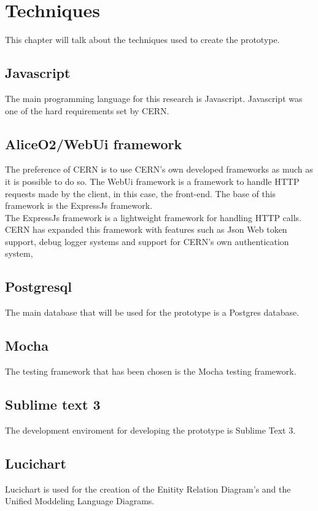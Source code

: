 \documentclass[paper=a4, fontsize=11pt,twoside]{scrartcl}	%
\begin{document}
 

\newpage
\section{Techniques}
This chapter will talk about the techniques used to create the prototype.

\subsection{Javascript}
The main programming language for this research is Javascript. Javascript was one of the hard requirements set by CERN.

\subsection{AliceO2/WebUi framework}
The preference of CERN is to use CERN's own developed frameworks as much as it is possible to do so. The WebUi framework is a framework to handle HTTP requests made by the client, in this case, the front-end. The base of this framework is the ExpressJs framework. \\
The ExpressJs framework is a lightweight framework for handling HTTP calls. CERN has expanded this framework with features such as Json Web token support, debug logger systems and support for CERN's own authentication system,

\subsection{Postgresql}
The main database that will be used for the prototype is a Postgres database. 

\subsection{Mocha}
The testing framework that has been chosen is the Mocha testing framework.

\subsection{Sublime text 3}
The development enviroment for developing the prototype is Sublime Text 3.

\subsection{Lucichart}
Lucichart is used for the creation of the Enitity Relation Diagram's and the Unified Moddeling Language Diagrams.
\end{document}
